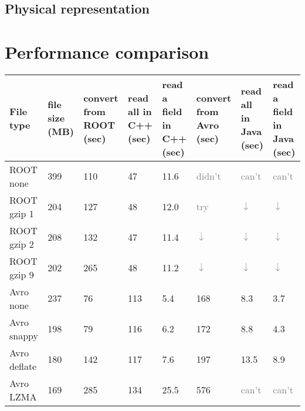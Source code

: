 \documentclass{article}
\begin{document}
\subsection*{Physical representation}









\vfill
\pagebreak

\section*{Performance comparison}

\noindent\begin{center}
\begin{tabular}{p{2.4 cm} | P{1.2 cm} P{1.9 cm} P{1.2 cm} P{1.8 cm} P{1.9 cm} P{1.2 cm} P{1.8 cm}}
File type & file size (MB) & convert from ROOT (sec) & read all in C++ (sec) & read a field in C++ (sec) & convert from Avro (sec) & read all in Java (sec) & read a field in Java (sec)      \\\hline
ROOT none     & 399 &          110 &           47 &         11.6 &       \textcolor{gray}{didn't} &        \textcolor{gray}{can't} &        \textcolor{gray}{can't} \\
ROOT gzip 1   & 204 &          127 &           48 &         12.0 &          \textcolor{gray}{try} & \textcolor{gray}{$\downarrow$} & \textcolor{gray}{$\downarrow$} \\
ROOT gzip 2   & 208 &          132 &           47 &         11.4 & \textcolor{gray}{$\downarrow$} & \textcolor{gray}{$\downarrow$} & \textcolor{gray}{$\downarrow$} \\
ROOT gzip 9   & 202 &          265 &           48 &         11.2 & \textcolor{gray}{$\downarrow$} & \textcolor{gray}{$\downarrow$} & \textcolor{gray}{$\downarrow$} \\\hline
Avro none     & 237 &           76 &          113 &          5.4 &          168 &          8.3 &          3.7 \\
Avro snappy   & 198 &           79 &          116 &          6.2 &          172 &          8.8 &          4.3 \\
Avro deflate  & 180 &          142 &          117 &          7.6 &          197 &         13.5 &          8.9 \\
Avro LZMA     & 169 &          285 &          134 &         25.5 &          576 &        \textcolor{gray}{can't} &        \textcolor{gray}{can't} \\\hline

\end{tabular}
\end{center}
\end{document}
